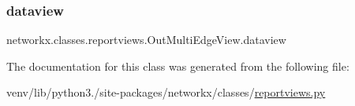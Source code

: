 \subsubsection{\texorpdfstring{dataview}{dataview}}
{\footnotesize\ttfamily networkx.\+classes.\+reportviews.\+Out\+Multi\+Edge\+View.\+dataview\hspace{0.3cm}{\ttfamily [static]}}



The documentation for this class was generated from the following file\+:\begin{DoxyCompactItemize}
\item 
venv/lib/python3./site-\/packages/networkx/classes/\hyperlink{reportviews_8py}{reportviews.\+py}\end{DoxyCompactItemize}
